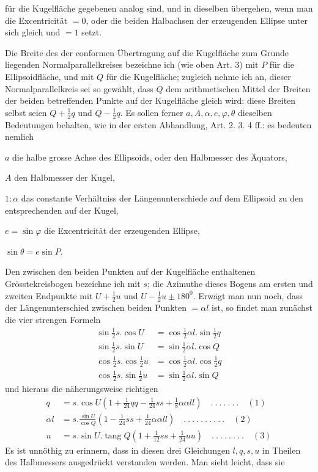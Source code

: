 %
für die Kugelfläche gegebenen analog sind, und in dieselben übergehen, wenn man die Excentricität \(=0\), oder die beiden Halbachsen der erzeugenden Ellipse unter sich gleich und \(=1\) setzt.

Die Breite des der conformen Übertragung auf die Kugelfläche zum Grunde liegenden Normalparallelkreises bezeichne ich (wie oben Art. 3) mit \(P\) für die Ellipsoidfläche, und mit \(Q\) für die Kugelfläche; zugleich nehme ich an, dieser Normalparallelkreis sei so gewählt, dass \(Q\) dem arithmetischen Mittel der Breiten der beiden betreffenden Punkte auf der Kugelfläche gleich wird: diese Breiten selbst seien \(Q+\frac12q\) und \(Q-\frac12q\). Es sollen ferner \(a,A,\alpha,e,\varphi,\theta\) dieselben Bedeutungen behalten, wie in der ersten Abhandlung, Art. 2. 3. 4 ff.: es bedeuten nemlich
\begin{list}{}{\setlength{\leftmargin}{1em}\setlength{\itemindent}{0pt}\setlength{\itemsep}{0pt}\setlength{\parsep}{0pt}}
\item \(a\) die halbe grosse Achse des Ellipsoids, oder den Halbmesser des Äquators,
\item \(A\) den Halbmesser der Kugel,
\item \(1:\alpha\) das constante Verhältniss der Längenunterschiede auf dem Ellipsoid zu den entsprechenden auf der Kugel,
\item \(e=\sin\varphi\) die Excentricität der erzeugenden Ellipse,
\item \(\sin\theta=e\sin P\).
\end{list}

\indent Den zwischen den beiden Punkten auf der Kugelfläche enthaltenen Grösstekreisbogen bezeichne ich mit \(s\); die Azimuthe dieses Bogens am ersten und zweiten Endpunkte mit \(U+\frac12u\) und \(U-\frac12u\pm180^0\). Erwägt man nun noch, dass der Längenunterschied zwischen beiden Punkten \(=\alpha l\) ist, so findet man zunächst die vier strengen Formeln
\[
\begin{aligned}
\sin\tfrac12s\mathord{.}\cos U&=\cos\tfrac12\alpha l\mathord{.}\sin\tfrac12q\\
\sin\tfrac12s\mathord{.}\sin U&=\sin\tfrac12\alpha l\mathord{.}\cos Q\\
\cos\tfrac12s\mathord{.}\cos\tfrac12u&=\cos\tfrac12\alpha l\mathord{.}\cos\tfrac12q\\
\cos\tfrac12s\mathord{.}\sin\tfrac12u&=\sin\tfrac12\alpha l\mathord{.}\sin Q
\end{aligned}
\]
und hieraus die näherungsweise richtigen
\[
\begin{aligned}
q&=s\mathord{.}\cos U(1+\tfrac1{24}qq-\tfrac1{24}ss+\tfrac18\alpha\alpha ll)\quad .\ .\ .\ .\ .\ .\ .\quad(1)\\
\alpha l&=s\mathord{.}\frac{\sin U}{\cos Q}(1-\tfrac1{24}ss+\tfrac1{24}\alpha\alpha ll)\quad .\ .\ .\ .\ .\ .\ .\ .\ .\ .\quad(2)\\
u&=s\mathord{.}\sin U\mathord{.}\operatorname{tang}Q(1+\tfrac1{12}ss+\tfrac1{24}uu)\quad .\ .\ .\ .\ .\ .\ .\ .\quad(3)
\end{aligned}
\]
Es ist unnöthig zu erinnern, dass in diesen drei Gleichungen \(l,q,s,u\) in Theilen des Halbmessers ausgedrückt verstanden werden. Man sieht leicht, dass sie
